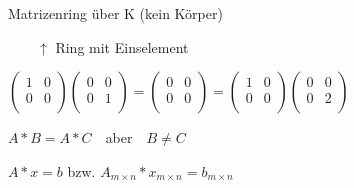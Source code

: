 \documentclass{../tudscript}
\begin{document}
\hypertarget{einfuxfchrung-in-die-mathematik-fuxfcr-informatikerinnen}{%
\label{einfuxfchrung-in-die-mathematik-fuxfcr-informatikerinnen}}

\hypertarget{vl}{%
\label{vl}}

\hypertarget{matritzen}{%
\label{matritzen}}

Matrizenring über K (kein Körper)

\({\qquad \uparrow}\) Ring mit Einselement

\({\begin{pmatrix}  1 & 0 \\  0 & 0 \\ \end{pmatrix}\begin{pmatrix}  0 & 0 \\  0 & 1 \\ \end{pmatrix} = \begin{pmatrix}  0 & 0 \\  0 & 0 \\ \end{pmatrix} = \begin{pmatrix}  1 & 0 \\  0 & 0 \\ \end{pmatrix}\begin{pmatrix}  0 & 0 \\  0 & 2 \\ \end{pmatrix}}\)

\({A * B = A * C \quad }\)aber\({ \quad B \neq C}\)

\hypertarget{kurz}{%
\label{kurz}}

\(A * x = b\) bzw. \(A_{m \times n} *x_{m \times n} = b_{m \times n}\)

\hypertarget{lang}{%
\label{lang}}
\end{document}
